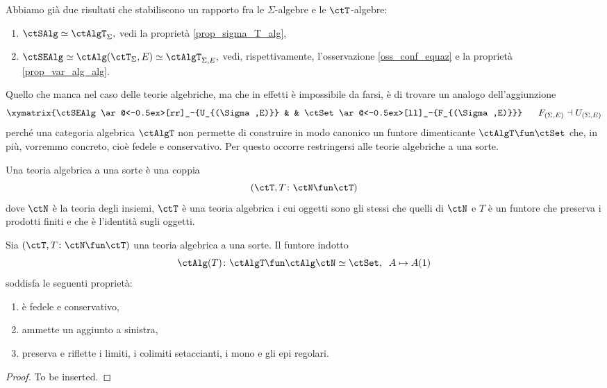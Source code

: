 Abbiamo già due risultati che stabiliscono un rapporto fra le $\Sigma$-algebre e le $\ctT$-algebre:
\begin{enumerate}
\item $\ctSAlg \simeq \ctAlgT_{\Sigma},$ vedi la proprietà \ref{prop_sigma_T_alg},
\item $\ctSEAlg \simeq \ctAlg(\ctT_{\Sigma},E) \simeq \ctAlgT_{\Sigma,E},$ vedi, rispettivamente, l'osservazione 
\ref{oss_conf_equaz} e la proprietà \ref{prop_var_alg_alg}.
\end{enumerate}

Quello che manca nel caso delle teorie algebriche, ma che in effetti è impossibile da farsi, è di trovare un analogo
dell'aggiunzione
$$\xymatrix{\ctSEAlg \ar@<-0.5ex>[rr]_-{U_{(\Sigma,E)}} & & \ctSet \ar@<-0.5ex>[ll]_-{F_{(\Sigma,E)}}}
\;\;\;\;\;\; F_{(\Sigma,E)} \dashv U_{(\Sigma,E)}$$
perché una categoria algebrica $\ctAlgT$ non permette di construire in modo canonico un funtore dimenticante 
$\ctAlgT \fun \ctSet$ che, in più, vorremmo concreto, cioè fedele e conservativo. Per questo occorre restringersi alle 
teorie algebriche a una sorte.

\begin{definition}\label{def_th_alg_unasorte}
Una teoria algebrica a una sorte è una coppia
$$(\ctT, T \colon \ctN \fun \ctT)$$
dove $\ctN$ è la teoria degli insiemi, $\ctT$ è una teoria algebrica i cui oggetti sono gli stessi che quelli di $\ctN$ e $T$ 
è un funtore che preserva i prodotti finiti e che è l'identità sugli oggetti.
\end{definition} 

\begin{proposition}\label{prop_funt_ind_unasorte}
Sia $(\ctT, T \colon \ctN \fun \ctT)$ una teoria algebrica a una sorte. Il funtore indotto
$$\ctAlg(T) \colon \ctAlgT \fun \ctAlg\ctN \simeq \ctSet , \;\; A \mapsto A(1)$$
soddisfa le seguenti proprietà:
\begin{enumerate}
\item è fedele e conservativo,
\item ammette un aggiunto a sinistra,
\item preserva e riflette i limiti, i colimiti setaccianti, i mono e gli epi regolari.
\end{enumerate}
\end{proposition}

\begin{proof}
To be inserted.
\end{proof}

